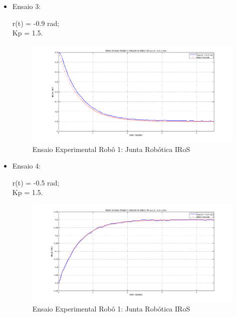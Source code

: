 \documentclass[12pt,oneside,a4paper, chapter=TITLE, section = TITLE, english, brazil]{abntex2}
\begin{document}
\begin{itemize}
\item Ensaio 3:
 
r(t) = -0.9 rad;\\
Kp = 1.5.\\

\begin{figure}[h] %
\centering
\includegraphics[scale=0.43]{./imagens/Simu2_1_robo}
\caption[Ensaio Experimental Robô 1: Junta Robótica IRoS]{Ensaio Experimental Robô 1: Junta Robótica IRoS}
\label{fig:simu2_1_robo}
\end{figure}


\item Ensaio 4:
 
r(t) = -0.5 rad;\\
Kp = 1.5.\\

\begin{figure}[h] %
\centering
\includegraphics[scale=0.42]{./imagens/Simu2_2_robo}
\caption[Ensaio Experimental Robô 1: Junta Robótica IRoS]{Ensaio Experimental Robô 1: Junta Robótica IRoS}
\label{fig:simu2_2_robo}
\end{figure}



\end{itemize}
\end{document}
